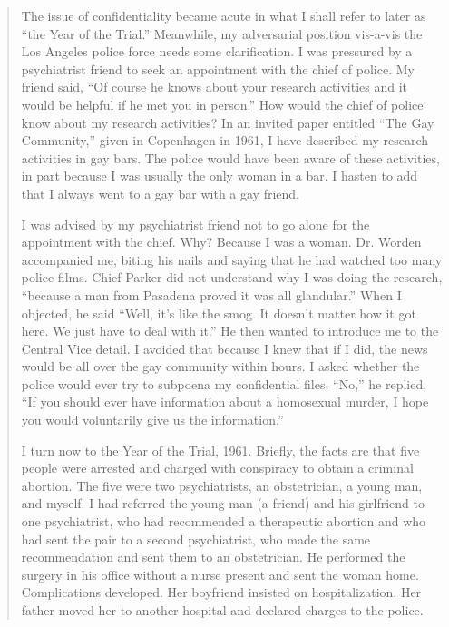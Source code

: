 \begin{refsection}
\begin{quote}
The issue of confidentiality became acute in what I shall refer to later as ``the Year of the Trial.'' Meanwhile, my adversarial position vis-a-vis the Los Angeles police force needs some clarification. I was pressured by a psychiatrist friend to seek an appointment with the chief of police. My friend said, ``Of course he knows about your research activities and it would be helpful if he met you in person.'' How would the chief of police know about my research activities? In an invited paper entitled ``The Gay Community,'' given in Copenhagen in 1961, I have described my research activities in gay bars. The police would have been aware of these activities, in part because I was usually the only woman in a bar. I hasten to add that I always went to a gay bar with a gay friend.

I was advised by my psychiatrist friend not to go alone for the appointment with the chief. Why? Because I was a woman. Dr. Worden accompanied me, biting his nails and saying that he had watched too many police films. Chief Parker did not understand why I was doing the research, ``because a man from Pasadena proved it was all glandular.'' When I objected, he said ``Well, it's like the smog. It doesn't matter how it got here. We just have to deal with it.'' He then wanted to introduce me to the Central Vice detail. I avoided that because I knew that if I did, the news would be all over the gay community within hours. I asked whether the police would ever try to subpoena my confidential files. ``No,'' he replied, ``If you should ever have information about a homosexual murder, I hope you would voluntarily give us the information.''

I turn now to the Year of the Trial, 1961. Briefly, the facts are that five people were arrested and charged with conspiracy to obtain a criminal abortion. The five were two psychiatrists, an obstetrician, a young man, and myself. I had referred the young man (a friend) and his girlfriend to one psychiatrist, who had recommended a therapeutic abortion and who had sent the pair to a second psychiatrist, who made the same recommendation and sent them to an obstetrician. He performed the surgery in his office without a nurse present and sent the woman home. Complications developed. Her boyfriend insisted on hospitalization. Her father moved her to another hospital and declared charges to the police.


\end{quote}
\end{refsection}
